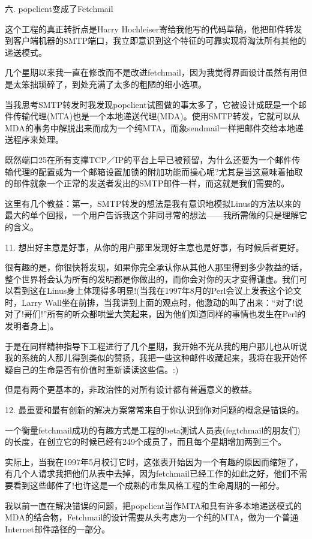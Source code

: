 \documentclass[a4paper,12pt,UTF8,twoside]{ctexbook}
\begin{document}
六. popclient变成了Fetchmail


这个工程的真正转折点是Harry Hochleiser寄给我他写的代码草稿，他把邮件转发到客户端机器的SMTP端口，我立即意识到这个特征的可靠实现将淘汰所有其他的递送模式。


几个星期以来我一直在修改而不是改进fetchmail，因为我觉得界面设计虽然有用但是太笨拙琐碎了，到处充满了太多的粗陋的细小选项。


当我思考SMTP转发时我发现popclient试图做的事太多了，它被设计成既是一个邮件传输代理(MTA)也是一个本地递送代理(MDA)。使用SMTP转发，它就可以从MDA的事务中解脱出来而成为一个纯MTA，而象sendmail一样把邮件交给本地递送程序来处理。


既然端口25在所有支撑TCP／IP的平台上早已被预留，为什么还要为一个邮件传输代理的配置或为一个邮箱设置加锁的附加功能而操心呢?尤其是当这意味着抽取的邮件就象一个正常的发送者发出的SMTP邮件一样，而这就是我们需要的。


这里有几个教益：第一，SMTP转发的想法是我有意识地模拟Linus的方法以来的最大的单个回报，一个用户告诉我这个非同寻常的想法——我所需做的只是理解它的含义。


11. 想出好主意是好事，从你的用户那里发现好主意也是好事，有时候后者更好。


很有趣的是，你很快将发现，如果你完全承认你从其他人那里得到多少教益的话，整个世界将会认为所有的发明都是你做出的，而你会对你的天才变得谦虚。我们可以看到这在Linus身上体现得多明显!(当我在1997年8月的Perl会议上发表这个论文时，Larry Wall坐在前排，当我讲到上面的观点时，他激动的叫了出来：“对了!说对了!哥们!”所有的听众都哄堂大笑起来，因为他们知道同样的事情也发生在Perl的发明者身上)。


于是在同样精神指导下工程进行了几个星期，我开始不光从我的用户那儿也从听说我的系统的人那儿得到类似的赞扬，我把一些这种邮件收藏起来，我将在我开始怀疑自己的生命是否有价值时重新读读这些信。:)


但是有两个更基本的，非政治性的对所有设计都有普遍意义的教益。


12. 最重要和最有创新的解决方案常常来自于你认识到你对问题的概念是错误的。

一个衡量fetchmail成功的有趣方式是工程的beta测试人员表(fegtchmail的朋友们)的长度，在创立它的时候已经有249个成员了，而且每个星期增加两到三个。


实际上，当我在1997年5月校订它时，这张表开始因为一个有趣的原因而缩短了，有几个人请求我把他们从表中去掉，因为fetchmail已经工作的如此之好，他们不需要看到这些邮件了!也许这是一个成熟的市集风格工程的生命周期的一部分。

我以前一直在解决错误的问题，把popclient当作MTA和具有许多本地递送模式的MDA的结合物，Fetchmail的设计需要从头考虑为一个纯的MTA，做为一个普通Internet邮件路径的一部分。
\end{document}
